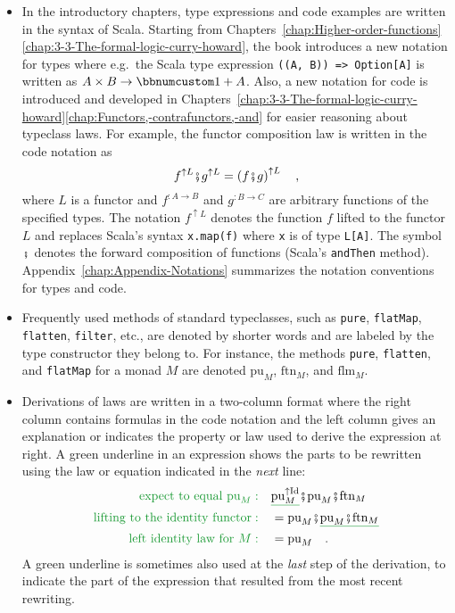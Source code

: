 \begin{itemize}
\item In the introductory chapters, type expressions and code examples are
written in the syntax of Scala. Starting from Chapters~\ref{chap:Higher-order-functions}\textendash \ref{chap:3-3-The-formal-logic-curry-howard},
the book introduces a new notation for types where e.g.~the Scala
type expression \lstinline!((A, B)) => Option[A]! is written as $A\times B\rightarrow\bbnum 1+A$.
Also, a new notation for code is introduced and developed in Chapters~\ref{chap:3-3-The-formal-logic-curry-howard}\textendash \ref{chap:Functors,-contrafunctors,-and}
for easier reasoning about typeclass laws. For example, the functor
composition law is written in the code notation as
\[
f^{\uparrow L}\bef g^{\uparrow L}=\left(f\bef g\right)^{\uparrow L}\quad,
\]
where $L$ is a functor and $f^{:A\rightarrow B}$ and $g^{:B\rightarrow C}$
are arbitrary functions of the specified types. The notation $f^{\uparrow L}$
denotes the function $f$ lifted to the functor $L$ and replaces
Scala's syntax \lstinline!x.map(f)! where \lstinline!x! is of type
\lstinline!L[A]!. The symbol $\bef$ denotes the forward composition
of functions (Scala's \lstinline!andThen! method). Appendix~\ref{chap:Appendix-Notations}
summarizes the notation conventions for types and code.
\item Frequently used methods of standard typeclasses, such as \lstinline!pure!,
\lstinline!flatMap!, \lstinline!flatten!, \lstinline!filter!, etc.,
are denoted by shorter words and are labeled by the type constructor
they belong to. For instance, the methods \lstinline!pure!, \lstinline!flatten!,
and \lstinline!flatMap! for a monad $M$ are denoted $\text{pu}_{M}$,
$\text{ftn}_{M}$, and $\text{flm}_{M}$.
\item Derivations of laws are written in a two-column format where the right
column contains formulas in the code notation and the left column
gives an explanation or indicates the property or law used to derive
the expression at right. A green underline in an expression shows
the parts to be rewritten using the law or equation indicated in the
\emph{next} line:
\begin{align*}
{\color{greenunder}\text{expect to equal }\text{pu}_{M}:}\quad & \gunderline{\text{pu}_{M}^{\uparrow\text{Id}}}\bef\text{pu}_{M}\bef\text{ftn}_{M}\\
{\color{greenunder}\text{lifting to the identity functor}:}\quad & =\text{pu}_{M}\bef\gunderline{\text{pu}_{M}\bef\text{ftn}_{M}}\\
{\color{greenunder}\text{left identity law for }M:}\quad & =\text{pu}_{M}\quad.
\end{align*}
A green underline is sometimes also used at the \emph{last} step of
the derivation, to indicate the part of the expression that resulted
from the most recent rewriting.
\end{itemize}

